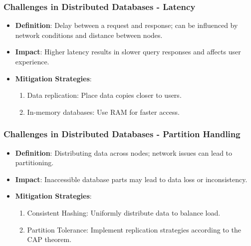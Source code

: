 \documentclass[aspectratio=169]{beamer}
\begin{document}
\begin{frame}[fragile]
    \frametitle{Challenges in Distributed Databases - Latency}
    
    \begin{itemize}
        \item \textbf{Definition}: Delay between a request and response; can be influenced by network conditions and distance between nodes.
        \item \textbf{Impact}: Higher latency results in slower query responses and affects user experience.
        \item \textbf{Mitigation Strategies}:
        \begin{enumerate}
            \item Data replication: Place data copies closer to users.
            \item In-memory databases: Use RAM for faster access.
        \end{enumerate}
    \end{itemize}
\end{frame}

\begin{frame}[fragile]
    \frametitle{Challenges in Distributed Databases - Partition Handling}
    
    \begin{itemize}
        \item \textbf{Definition}: Distributing data across nodes; network issues can lead to partitioning.
        \item \textbf{Impact}: Inaccessible database parts may lead to data loss or inconsistency.
        \item \textbf{Mitigation Strategies}:
        \begin{enumerate}
            \item Consistent Hashing: Uniformly distribute data to balance load.
            \item Partition Tolerance: Implement replication strategies according to the CAP theorem.
        \end{enumerate}
    \end{itemize}
\end{frame}
\end{document}
